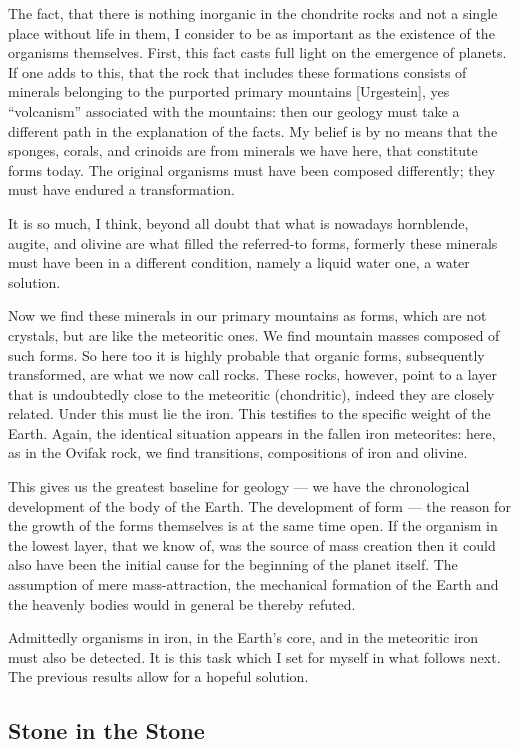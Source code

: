 \documentclass[a4paper, 12pt, oneside]{article}
\begin{document}
The fact, that there is nothing inorganic in the chondrite rocks and not a single place without life in them, I consider to be as important as the existence of the organisms themselves. First, this fact casts full light on the emergence of planets. If one adds to this, that the rock that includes these formations consists of minerals belonging to the purported primary mountains [Urgestein], yes ``volcanism'' associated with the mountains: then our geology must take a different path in the explanation of the facts. My belief is by no means that the sponges, corals, and crinoids are from minerals we have here, that constitute forms today. The original organisms must have been composed differently; they must have endured a transformation.

It is so much, I think, beyond all doubt that what is nowadays hornblende, augite, and olivine are what filled the referred-to forms, formerly these minerals must have been in a different condition, namely a liquid water one, a water solution.

Now we find these minerals in our primary mountains as forms, which are not crystals, but are like the meteoritic ones. We find mountain masses composed of such forms. So here too it is highly probable that organic forms, subsequently transformed, are what we now call rocks. These rocks, however, point to a layer that is undoubtedly close to the meteoritic (chondritic), indeed they are closely related. Under this must lie the iron. This testifies to the specific weight of the Earth. Again, the identical situation appears in the fallen iron meteorites: here, as in the Ovifak rock, we find transitions, compositions of iron and olivine.

This gives us the greatest baseline for geology --- we have the chronological development of the body of the Earth. The development of form --- the reason for the growth of the forms themselves is at the same time open. If the organism in the lowest layer, that we know of, was the source of mass creation then it could also have been the initial cause for the beginning of the planet itself. The assumption of mere mass-attraction, the mechanical formation of the Earth and the heavenly bodies would in general be thereby refuted.

Admittedly organisms in iron, in the Earth's core, and in the meteoritic iron must also be detected. It is this task which I set for myself in what follows next. The previous results allow for a hopeful solution.
\clearpage
\subsection{Stone in the Stone}
\end{document}
